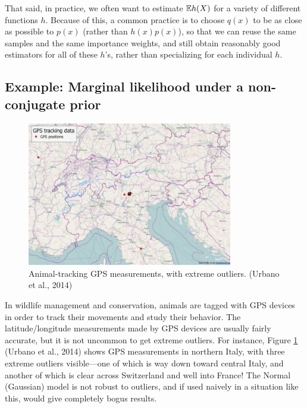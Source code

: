 \documentclass[12pt]{article}
\begin{document}
That said, in practice, we often want to estimate $\mathbb{E} h(X)$ for a variety of different functions $h$. Because of this, a common practice is to choose $q(x)$ to be as close as possible to $p(x)$ (rather than $h(x) p(x)$), so that we can reuse the same samples and the same importance weights, and still obtain reasonably good estimators for all of these $h$'s, rather than specializing for each individual $h$.

\subsection{Example: Marginal likelihood under a non-conjugate prior}
\label{section:gps}

\begin{figure}
  \begin{center}
    \includegraphics[width=0.8\textwidth]{urbano-GPS-outliers.png}
  \end{center}
  \caption{Animal-tracking GPS measurements, with extreme outliers. (Urbano et al., 2014)}
  \label{figure:urbano-GPS-outliers}
\end{figure}

In wildlife management and conservation, animals are tagged with GPS devices in order to track their movements and study their behavior. The latitude/longitude measurements made by GPS devices are usually fairly accurate, but it is not uncommon to get extreme outliers. For instance, Figure \ref{figure:urbano-GPS-outliers} (Urbano et al., 2014) shows GPS measurements in northern Italy, with three extreme outliers visible---one of which is way down toward central Italy, and another of which is clear across Switzerland and well into France!  The Normal (Gaussian) model is not robust to outliers, and if used naively in a situation like this, would give completely bogus results.
\end{document}
